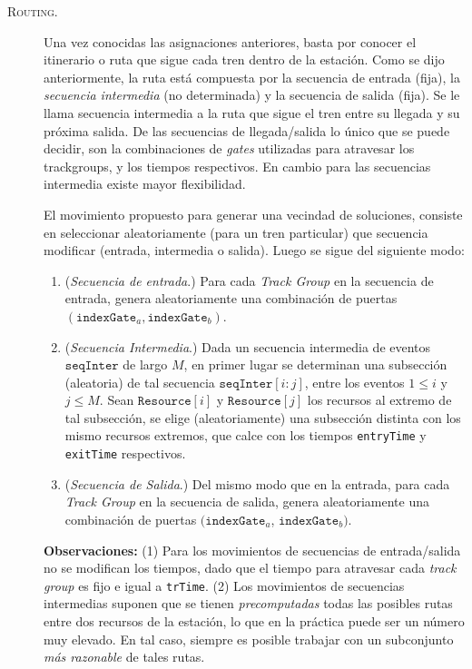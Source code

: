 \documentclass[letter, 10pt]{article}
\begin{document}
\begin{description}
    

    \item[\textsc{Routing.}] Una vez conocidas las asignaciones anteriores, basta por conocer el itinerario o ruta que sigue cada tren dentro de la estación. Como se dijo anteriormente, la ruta está compuesta por la secuencia de entrada (fija), la \textit{secuencia intermedia} (no determinada) y la secuencia de salida (fija). Se le llama secuencia intermedia  a la ruta que sigue el tren entre su llegada y su próxima salida. De las secuencias de llegada/salida lo único que se puede decidir, son la combinaciones de \textit{gates} utilizadas para atravesar los trackgroups, y los tiempos respectivos. En cambio para las secuencias intermedia existe mayor flexibilidad.

    El movimiento propuesto para generar una vecindad de soluciones, consiste en seleccionar aleatoriamente (para un tren particular) que secuencia modificar (entrada, intermedia o salida). Luego se sigue del siguiente modo:
    \begin{enumerate}
        \item (\textit{Secuencia de entrada}.) Para cada \textit{Track Group} en la secuencia de entrada, genera aleatoriamente una combinación de puertas $(\texttt{indexGate}_a, \texttt{indexGate}_b)$.

        \item (\textit{Secuencia Intermedia}.) Dada un secuencia intermedia de eventos $\texttt{seqInter}$ de largo $M$, en primer lugar se determinan una subsección (aleatoria) de tal secuencia $\texttt{seqInter}[i:j]$, entre los eventos $1 \leq i$ y $j \leq M$. Sean $\texttt{Resource}[i]$ y $\texttt{Resource}[j]$ los recursos al extremo de tal subsección, se elige (aleatoriamente) una subsección distinta con los mismo recursos extremos, que calce con los tiempos \texttt{entryTime} y \texttt{exitTime} respectivos.  

        \item (\textit{Secuencia de Salida}.) Del mismo modo que en la entrada, para cada \textit{Track Group} en la secuencia de salida, genera aleatoriamente una combinación de puertas $(\texttt{indexGate}_a$, $\texttt{indexGate}_b)$.
    \end{enumerate}
    \textbf{Observaciones:} (1) Para los movimientos de secuencias de entrada/salida no se modifican los tiempos, dado que el tiempo para atravesar cada \textit{track group} es fijo e igual a \texttt{trTime}. (2) Los movimientos de secuencias intermedias suponen que se tienen \textit{precomputadas} todas las posibles rutas entre dos recursos de la estación, lo que en la práctica puede ser un número muy elevado. En tal caso, siempre es posible trabajar con un subconjunto \textit{más razonable} de tales rutas.
\end{description}
\end{document}
